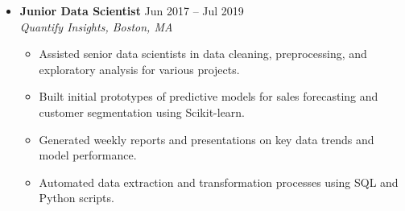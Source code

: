 \documentclass[10pt]{article} %
\newenvironment{resumelist}{
    \begin{itemize}[label=\textbullet, leftmargin=1em, noitemsep, topsep=2pt, parsep=0pt, partopsep=0pt]
}{
    \end{itemize}
}
\begin{document}
\begin{itemize}[leftmargin=*, label={}]
\begin{resumelist}
\item Participated in the design and optimization of data warehousing solutions (PostgreSQL, Redshift) for analytical purposes.
    \end{resumelist}
\item \textbf{Junior Data Scientist} \hfill Jun 2017 -- Jul 2019 \\
    \textit{Quantify Insights, Boston, MA}
    \begin{resumelist}
\item Assisted senior data scientists in data cleaning, preprocessing, and exploratory analysis for various projects.
\item Built initial prototypes of predictive models for sales forecasting and customer segmentation using Scikit-learn.
\item Generated weekly reports and presentations on key data trends and model performance.
\item Automated data extraction and transformation processes using SQL and Python scripts.
    \end{resumelist}
\end{itemize}
\end{document}
